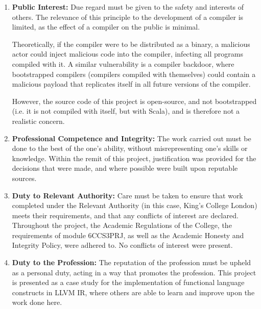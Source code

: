 \begin{enumerate}
    \item \textbf{Public Interest:} Due regard must be given to the safety and interests of others.
          The relevance of this principle to the development of a compiler is limited, as the effect
          of a compiler on the public is minimal.

          Theoretically, if the compiler were to be distributed as a binary, a malicious actor could
          inject malicious code into the compiler, infecting all programs compiled with it. A
          similar vulnerability is a compiler backdoor, where bootstrapped compilers (compilers
          compiled with themselves) could contain a malicious payload that replicates itself in all
          future versions of the compiler.~\autocite{thompson1984reflection}

          However, the source code of this project is open-source, and not bootstrapped (i.e. it is
          not compiled with itself, but with Scala), and is therefore not a realistic concern.

    \item \textbf{Professional Competence and Integrity:} The work carried out must be done to the
          best of the one's ability, without misrepresenting one's skills or knowledge. Within the
          remit of this project, justification was provided for the decisions that were made, and
          where possible were built upon reputable sources.

    \item \textbf{Duty to Relevant Authority:} Care must be taken to ensure that work completed
          under the Relevant Authority (in this case, King's College London) meets their
          requirements, and that any conflicts of interest are declared. Throughout the project, the
          Academic Regulations of the College, the requirements of module 6CCS3PRJ, as well as the
          Academic Honesty and Integrity Policy, were adhered to. No conflicts of interest were
          present.

    \item \textbf{Duty to the Profession:} The reputation of the profession must be upheld as a
          personal duty, acting in a way that promotes the profession. This project is presented as
          a case study for the implementation of functional language constructs in LLVM IR, where
          others are able to learn and improve upon the work done here.
\end{enumerate}

